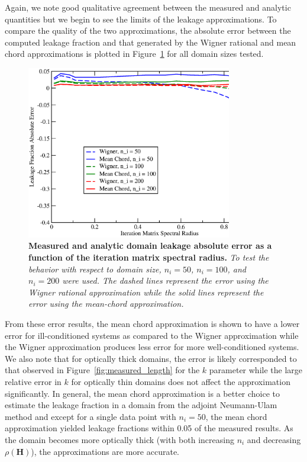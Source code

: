 \documentclass[preprint,11pt]{elsarticle}
\newcommand{\ve}[1]{\ensuremath{\mathbf{#1}}}
\begin{document}
Again, we note good qualitative agreement between the measured and
analytic quantities but we begin to see the limits of the leakage
approximations. To compare the quality of the two approximations, the
absolute error between the computed leakage fraction and that
generated by the Wigner rational and mean chord approximations is
plotted in Figure~\ref{fig:leakage_error} for all domain sizes
tested. 
\begin{figure}[ht!]
  \begin{center}
    \includegraphics[width=0.8\textwidth]{leakage_error.eps}
  \end{center}
  \caption{\textbf{Measured and analytic domain leakage absolute error as a
      function of the iteration matrix spectral radius.} \textit{To test the
      behavior with respect to domain size, $n_i=50$, $n_i=100$, and $n_i=200$
      were used. The dashed lines represent the error using the Wigner
      rational approximation while the solid lines represent the error using
      the mean-chord approximation.}}
  \label{fig:leakage_error}
\end{figure}
From these error results, the mean chord approximation is shown to have a
lower error for ill-conditioned systems as compared to the Wigner
approximation while the Wigner approximation produces less error for more
well-conditioned systems. We also note that for optically thick domains, the
error is likely corresponded to that observed in
Figure~\ref{fig:measured_length} for the $k$ parameter while the large
relative error in $k$ for optically thin domains does not affect the
approximation significantly. In general, the mean chord approximation is a
better choice to estimate the leakage fraction in a domain from the adjoint
Neumann-Ulam method and except for a single data point with $n_i=50$, the mean
chord approximation yielded leakage fractions within 0.05 of the measured
results. As the domain becomes more optically thick (with both increasing
$n_i$ and decreasing $\rho(\ve{H})$), the approximations are more accurate.
\end{document}
